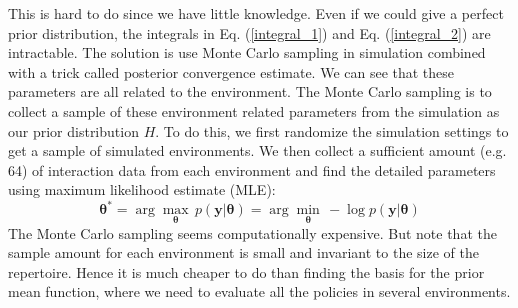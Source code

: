 \documentclass[journal]{IEEEtran}
\begin{document}
This is hard to do since we have little knowledge.
Even if we could give a perfect prior distribution, the integrals in Eq. (\ref{integral_1}) and Eq. (\ref{integral_2}) are intractable.
The solution is use Monte Carlo sampling in simulation combined with a trick called posterior convergence estimate.
We can see that these parameters are all related to the environment.
The Monte Carlo sampling is to collect a sample of these environment related parameters from the simulation as our prior distribution $H$.
To do this, we first randomize the simulation settings to get a sample of simulated environments.
We then collect a sufficient amount (e.g. 64) of interaction data from each environment and find the detailed parameters using maximum likelihood estimate (MLE):
\begin{equation}
\bm{\theta}^* = 
\arg \max_{\bm{\theta}} \, p(\bm{y}|\bm{\theta})
= \arg \min_{\bm{\theta}} \, -\log p(\bm{y}|\bm{\theta})
\label{MLE}
\end{equation}
The Monte Carlo sampling seems computationally expensive. But note that the sample amount for each environment is small and invariant to the size of the repertoire.
Hence it is much cheaper to do than finding the basis for the prior mean function, where we need to evaluate all the policies in several environments.
\end{document}
